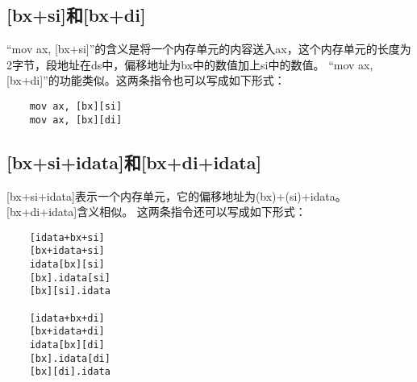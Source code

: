 \documentclass[a4paper,left=2.5cm,right=2.5cm,11pt]{article}
\begin{document}
\subsection{[bx+si]和[bx+di]}
	“mov ax, [bx+si]”的含义是将一个内存单元的内容送入ax，这个内存单元的长度为2字节，段地址在ds中，偏移地址为bx中的数值加上si中的数值。
	“mov ax, [bx+di]”的功能类似。这两条指令也可以写成如下形式：
	\begin{lstlisting}
	mov ax, [bx][si]
	mov ax, [bx][di]
	\end{lstlisting}

\subsection{[bx+si+idata]和[bx+di+idata]}
	[bx+si+idata]表示一个内存单元，它的偏移地址为(bx)+(si)+idata。[bx+di+idata]含义相似。
	这两条指令还可以写成如下形式：
	\begin{lstlisting}
	[idata+bx+si]
	[bx+idata+si]
	idata[bx][si]
	[bx].idata[si]
	[bx][si].idata

	[idata+bx+di]
	[bx+idata+di]
	idata[bx][di]
	[bx].idata[di]
	[bx][di].idata
	\end{lstlisting}
\end{document}
